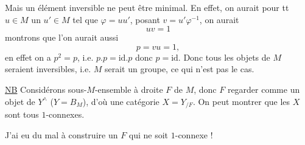 
Mais un élément inversible ne peut être minimal. En effet, on aurait pour tt $u\in M$ un $u'\in M$ tel que $\varphi=uu'$,   posant $v=u'\varphi^{-1}$, on aurait
\[
uv=1
\]
montrons que l'on aurait aussi
\[
p=vu=1,
\]
en effet on a $p^2=p$, i.e. $p.p=\mathrm{id}.p$ donc $p=\mathrm{id}$. Donc tous les objets de $M$ seraient inversibles, i.e. $M$ serait un groupe, ce qui n'est pas le cas.

\uline{NB} Considérons   sous-$M$-ensemble à droite $F$ de $M$, donc $F$  regarder comme un objet de $Y^\wedge$ ($Y=B_M$), d'où une catégorie $X=Y_{/F}$. On peut montrer que les $X$ sont tous $1$-connexes.

J'ai eu du mal à construire un $F$  qui ne soit $1$-connexe !

